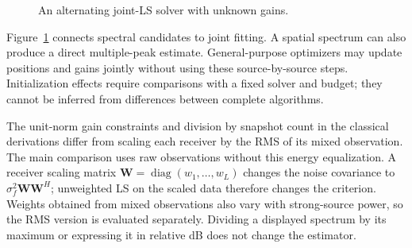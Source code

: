 \begin{figure}[!htbp]\centering
{}
\caption{An alternating joint-LS solver with unknown gains.}\label{fig:ug-flow}
\end{figure}
Figure~\ref{fig:ug-flow} connects spectral candidates to joint fitting. A spatial spectrum can also produce a direct multiple-peak estimate. General-purpose optimizers may update positions and gains jointly without using these source-by-source steps. Initialization effects require comparisons with a fixed solver and budget; they cannot be inferred from differences between complete algorithms.

The unit-norm gain constraints and division by snapshot count in the classical derivations\cite{ref04,ref06} differ from scaling each receiver by the RMS of its mixed observation. The main comparison uses raw observations without this energy equalization. A receiver scaling matrix $\mathbf W=\operatorname{diag}(w_1,\ldots,w_L)$ changes the noise covariance to $\sigma_f^2\mathbf W\mathbf W^H$; unweighted LS on the scaled data therefore changes the criterion. Weights obtained from mixed observations also vary with strong-source power, so the RMS version is evaluated separately. Dividing a displayed spectrum by its maximum or expressing it in relative dB does not change the estimator.

